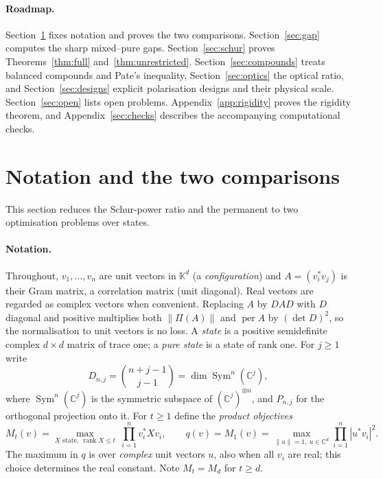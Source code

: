 \documentclass[11pt,a4paper]{article}
\theoremstyle{remark}
\newcommand{\per}{\operatorname{per}}
\newcommand{\norm}[1]{\left\lVert#1\right\rVert}
\newcommand{\C}{\mathbb C}
\newcommand{\K}{\mathbb K}
\DeclareMathOperator{\Sym}{Sym}
\begin{document}
\paragraph{Roadmap.}
Section~\ref{sec:compare} fixes notation and proves the two comparisons. Section~\ref{sec:gap} computes the sharp mixed--pure gaps. Section~\ref{sec:schur} proves Theorems~\ref{thm:full} and~\ref{thm:unrestricted}. Section~\ref{sec:compounds} treats balanced compounds and Pate's inequality, Section~\ref{sec:optics} the optical ratio, and Section~\ref{sec:designs} explicit polarisation designs and their physical scale. Section~\ref{sec:open} lists open problems. Appendix~\ref{app:rigidity} proves the rigidity theorem, and Appendix~\ref{sec:checks} describes the accompanying computational checks.

\section{Notation and the two comparisons}\label{sec:compare}
This section reduces the Schur-power ratio and the permanent to two optimisation problems over states.

\paragraph{Notation.}
Throughout, $v_1,\dots,v_n$ are unit vectors in $\K^d$ (a \emph{configuration}) and $A=(v_i^*v_j)$ is their Gram matrix, a correlation matrix (unit diagonal). Real vectors are regarded as complex vectors when convenient. Replacing $A$ by $DAD$ with $D$ diagonal and positive multiplies both $\norm{\Pi(A)}$ and $\per A$ by $(\det D)^2$, so the normalisation to unit vectors is no loss. A \emph{state} is a positive semidefinite complex $d\times d$ matrix of trace one; a \emph{pure state} is a state of rank one. For $j\ge1$ write
\[
D_{n,j}=\binom{n+j-1}{j-1}=\dim\Sym^n(\C^j),
\]
where $\Sym^n(\C^j)$ is the symmetric subspace of $(\C^j)^{\otimes n}$, and $P_{n,j}$ for the orthogonal projection onto it. For $t\ge1$ define the \emph{product objectives}
\[
 M_t(v)=\max_{X\text{ state},\ \operatorname{rank}X\le t}\ \prod_{i=1}^n v_i^*Xv_i,\qquad q(v)=M_1(v)=\max_{\norm u=1,\ u\in\C^d}\prod_{i=1}^n|u^*v_i|^2 .
\]
The maximum in $q$ is over \emph{complex} unit vectors $u$, also when all $v_i$ are real; this choice determines the real constant. Note $M_t=M_d$ for $t\ge d$.
\end{document}
